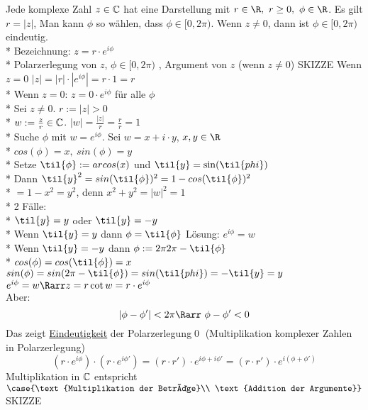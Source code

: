 Jede komplexe Zahl $z \in \text{$\mathbb{C}$}$ hat eine Darstellung  mit $r \in \R,\ r \geq 0,\ \phi \in \R$. Es gilt $r= |z|$, Man kann $\phi$ so wählen, dass $\phi \in [0, 2\pi)$. Wenn $z \neq 0$, dann ist $\phi \in [0, 2\pi)$ eindeutig.\\*
Bezeichnung: $z = r \cdot e^{i\phi}$\\*
Polarzerlegung von $z$, $\phi \in [0, 2\pi)$ , Argument von $z$ (wenn $z \neq 0$)
SKIZZE
\bew
Wenn $z = 0$ \Rarr{} $|z| = |r| \cdot |e^{i\phi}| = r \cdot 1 = r$\\*
Wenn $z = 0$: $z = 0 \cdot e^{i \phi}$ für alle $\phi$\\*
Sei $z \neq 0$. $r := |z| > 0$\\*
$w:= \frac{z}{r} \in \text{$\mathbb{C}$}$. $|w| = \frac{|z|}{r} = \frac{r}{r} = 1$\\*
Suche $\phi$ mit $w = e^{i \phi}$. Sei $w = x + i \cdot y$, $x,y \in \R$\\*
$cos(\phi) = x,\ sin(\phi) = y$\\*
Setze $\til{\phi} := arcos(x)$ und $\til{y} = \sin(\til{phi})$\\*
Dann $\til{y}^2 = sin(\til{\phi})^2 = 1 - cos(\til{\phi})^2$\\*
$= 1 - x^2 =  y^2$, denn $x^2 + y^2 = |w|^2 = 1$\\*
2 Fälle:\\*
$\til{y} = y$ oder $\til{y} = -y$\\*
Wenn $\til{y} = y$ dann $\phi = \til{\phi}$ Lösung: $e^{i\phi} = w$\\*
Wenn $\til{y} = -y$ dann $\phi := 2\pi 2\pi - \til{\phi}$\\*
$cos(\phi) = cos(\til{\phi}) = x$ \ok\\
$sin(\phi) = sin(2\pi - \til{\phi}) = sin(\til{phi}) = -\til{y} = y$ \ok\\
\Rarr{} $e^{i\phi} = w \Rarr z = r \cot w = r \cdot e^{i\phi}$\\
Aber:
$$|\phi-\phi'| < 2 \pi \Rarr\ \phi-\phi'<0$$
Das zeigt \ul{Eindeutigkeit} der Polarzerlegung\qed
\bem
(Multiplikation komplexer Zahlen in Polarzerlegung)
$$(r·e^{i\phi})·(r·e^{i\phi'})=(r·r')·e^{i\phi+i\phi'}=(r·r')·e^{i(\phi+\phi')}$$
Multiplikation in $\text{$\mathbb{C}$}$ entspricht $\case{\text{Multiplikation der Beträge}\\ \text{Addition der Argumente}}$ SKIZZE

